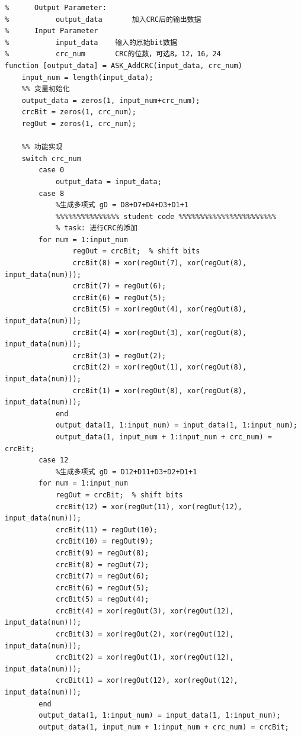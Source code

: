\documentclass[UTF8]{ctexart}
\begin{document}
\begin{lstlisting}[title=ASK\_AddCRC.m, frame=shadowbox]
%  Parameter List:
%      Output Parameter:
%           output_data       加入CRC后的输出数据
%      Input Parameter
%           input_data    输入的原始bit数据
%           crc_num       CRC的位数，可选8，12，16，24
function [output_data] = ASK_AddCRC(input_data, crc_num)
    input_num = length(input_data);
    %% 变量初始化
    output_data = zeros(1, input_num+crc_num);
    crcBit = zeros(1, crc_num);
    regOut = zeros(1, crc_num); 
    
    %% 功能实现
    switch crc_num
        case 0
            output_data = input_data;
        case 8
            %生成多项式 gD = D8+D7+D4+D3+D1+1
            %%%%%%%%%%%%%%% student code %%%%%%%%%%%%%%%%%%%%%%%
            % task: 进行CRC的添加
        for num = 1:input_num
                regOut = crcBit;  % shift bits
                crcBit(8) = xor(regOut(7), xor(regOut(8), input_data(num)));
                crcBit(7) = regOut(6);
                crcBit(6) = regOut(5);
                crcBit(5) = xor(regOut(4), xor(regOut(8), input_data(num)));
                crcBit(4) = xor(regOut(3), xor(regOut(8), input_data(num)));
                crcBit(3) = regOut(2);
                crcBit(2) = xor(regOut(1), xor(regOut(8), input_data(num)));
                crcBit(1) = xor(regOut(8), xor(regOut(8), input_data(num)));
            end
            output_data(1, 1:input_num) = input_data(1, 1:input_num);
            output_data(1, input_num + 1:input_num + crc_num) = crcBit;          
        case 12
            %生成多项式 gD = D12+D11+D3+D2+D1+1  
        for num = 1:input_num
            regOut = crcBit;  % shift bits
            crcBit(12) = xor(regOut(11), xor(regOut(12), input_data(num)));
            crcBit(11) = regOut(10);
            crcBit(10) = regOut(9);
            crcBit(9) = regOut(8);
            crcBit(8) = regOut(7);
            crcBit(7) = regOut(6);
            crcBit(6) = regOut(5);
            crcBit(5) = regOut(4);
            crcBit(4) = xor(regOut(3), xor(regOut(12), input_data(num)));
            crcBit(3) = xor(regOut(2), xor(regOut(12), input_data(num)));
            crcBit(2) = xor(regOut(1), xor(regOut(12), input_data(num)));
            crcBit(1) = xor(regOut(12), xor(regOut(12), input_data(num)));
        end
        output_data(1, 1:input_num) = input_data(1, 1:input_num);
        output_data(1, input_num + 1:input_num + crc_num) = crcBit;
                    

\end{lstlisting}
\end{document}
